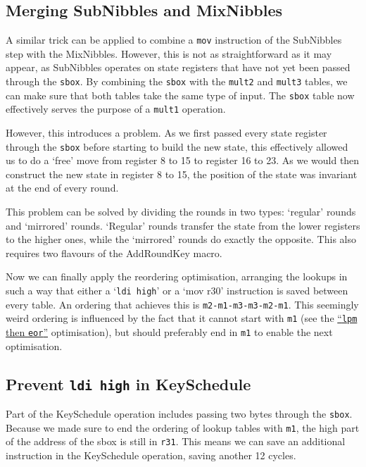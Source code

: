 \documentclass[a4paper]{article}
\begin{document}
\subsection*{Merging SubNibbles and MixNibbles}

A similar trick can be applied to combine a \texttt{mov} instruction of the SubNibbles step with the MixNibbles. However, this is not as straightforward as it may appear, as SubNibbles operates on state registers that have not yet been passed through the \texttt{sbox}. By combining the \texttt{sbox} with the \texttt{mult2} and \texttt{mult3} tables, we can make sure that both tables take the same type of input. The \texttt{sbox} table now effectively serves the purpose of a \texttt{mult1} operation.

However, this introduces a problem. As we first passed every state register through the \texttt{sbox} before starting to build the new state, this effectively allowed us to do a `free' move from register 8 to 15 to register 16 to 23. As we would then construct the new state in register 8 to 15, the position of the state was invariant at the end of every round.

This problem can be solved by dividing the rounds in two types: `regular' rounds and `mirrored' rounds. `Regular' rounds transfer the state from the lower registers to the higher ones, while the `mirrored' rounds do exactly the opposite. This also requires two flavours of the AddRoundKey macro.

Now we can finally apply the reordering optimisation, arranging the lookups in such a way that either a `\texttt{ldi high}' or a `mov r30' instruction is saved between every table. An ordering that achieves this is 
\texttt{m2-m1-m3-m3-m2-m1}. This seemingly weird ordering is influenced by the fact that it cannot start with \texttt{m1} (see the \hyperlink{lpmtheneor}{``\texttt{lpm} then \texttt{eor}''} optimisation), but should preferably end in \texttt{m1} to enable the next optimisation.

\subsection*{Prevent \texttt{ldi high} in KeySchedule}

Part of the KeySchedule operation includes passing two bytes through the \texttt{sbox}. Because we made sure to end the ordering of lookup tables with \texttt{m1}, the high part of the address of the sbox is still in \texttt{r31}. This means we can save an additional instruction in the KeySchedule operation, saving another 12 cycles.
\end{document}
